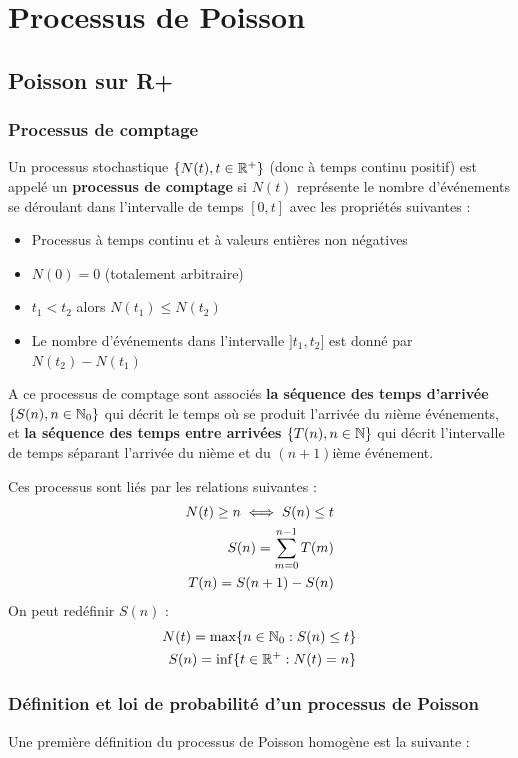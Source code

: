 \documentclass[11pt,a4paper]{article}
\numberwithin{equation}{section}
\begin{document}
\section{Processus de Poisson}
\subsection{Poisson sur R+}
\subsubsection{Processus de comptage}
Un processus stochastique $\{N(t), t\in \R^+\}$ (donc à temps continu positif) est appelé un \textbf{processus de comptage} si $N(t)$ représente le nombre d'événements se déroulant dans l'intervalle de temps $[0,t]$ avec les propriétés suivantes :
\begin{itemize}
    \item Processus à temps continu et à valeurs entières non négatives
    \item $N(0) = 0$ (totalement arbitraire)
    \item $t_1 < t_2$ alors $N(t_1) \leq N(t_2)$
    \item Le nombre d'événements dans l'intervalle $]t_1,t_2]$ est donné par $N(t_2) - N(t_1)$
\end{itemize}
A ce processus de comptage sont associés \textbf{la séquence des temps d'arrivée} $\{S(n), n \in \N_0\}$ qui décrit le temps où se produit l'arrivée du $n$ième événements, et \textbf{la séquence des temps entre arrivées} $\{T(n), n \in \N\}$ qui décrit l'intervalle de temps séparant l'arrivée du nième et du $(n+1)$ième événement. 

Ces processus sont liés par les relations suivantes : 
\begin{align}
    N(t) \geq n \iff S(n) \leq t\\
    S(n) = \somme{n-1}{m=0}T(m)\\
    T(n) = S(n+1) - S(n)
\end{align}
On peut redéfinir $S(n)$ : 
\begin{align}
    N(t) =  \max\{n \in \N_0 : S(n) \leq t\}\\
    S(n) = \inf\{t \in \R^+ : N(t) = n\}
\end{align}

\subsubsection{Définition et loi de probabilité d'un processus de Poisson}
Une première définition du processus de Poisson homogène est la suivante :
\end{document}
